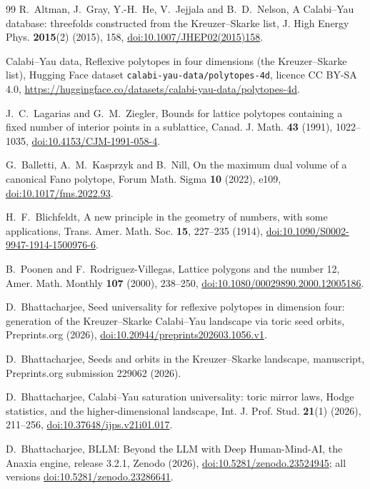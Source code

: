\documentclass[manuscript]{aomart}
\theoremstyle{definition}
\theoremstyle{remark}
\begin{document}
\begin{thebibliography}{99}
R.~Altman, J.~Gray, Y.-H.~He, V.~Jejjala and B.~D.~Nelson, A Calabi--Yau
database: threefolds constructed from the Kreuzer--Skarke list, J. High
Energy Phys. \textbf{2015}(2) (2015), 158,
\href{https://doi.org/10.1007/JHEP02(2015)158}{doi:10.1007/JHEP02(2015)158}.

Calabi--Yau data, Reflexive polytopes in four dimensions (the
Kreuzer--Skarke list), Hugging Face dataset
\texttt{calabi-yau-data/polytopes-4d}, licence CC BY-SA 4.0,
\url{https://huggingface.co/datasets/calabi-yau-data/polytopes-4d}.

J.~C.~Lagarias and G.~M.~Ziegler, Bounds for lattice polytopes containing
a fixed number of interior points in a sublattice, Canad. J. Math.
\textbf{43} (1991), 1022--1035,
\href{https://doi.org/10.4153/CJM-1991-058-4}{doi:10.4153/CJM-1991-058-4}.

G.~Balletti, A.~M.~Kasprzyk and B.~Nill, On the maximum dual volume of a
canonical Fano polytope, Forum Math. Sigma \textbf{10} (2022), e109,
\href{https://doi.org/10.1017/fms.2022.93}{doi:10.1017/fms.2022.93}.

H.~F.~Blichfeldt, A new principle in the geometry of numbers, with some
applications, Trans. Amer. Math. Soc. \textbf{15}, 227--235 (1914),
\href{https://doi.org/10.1090/S0002-9947-1914-1500976-6}{doi:10.1090/S0002-9947-1914-1500976-6}.

B.~Poonen and F.~Rodriguez-Villegas, Lattice polygons and the number 12,
Amer. Math. Monthly \textbf{107} (2000), 238--250,
\href{https://doi.org/10.1080/00029890.2000.12005186}{doi:10.1080/00029890.2000.12005186}.

D.~Bhattacharjee, Seed universality for reflexive polytopes in dimension
four: generation of the Kreuzer--Skarke Calabi--Yau landscape via toric
seed orbits, Preprints.org (2026),
\href{https://doi.org/10.20944/preprints202603.1056.v1}{doi:10.20944/preprints202603.1056.v1}.

D.~Bhattacharjee, Seeds and orbits in the Kreuzer--Skarke landscape,
manuscript, Preprints.org submission 229062 (2026).

D.~Bhattacharjee, Calabi--Yau saturation universality: toric mirror laws,
Hodge statistics, and the higher-dimensional landscape, Int. J. Prof.
Stud. \textbf{21}(1) (2026), 211--256,
\href{https://doi.org/10.37648/ijps.v21i01.017}{doi:10.37648/ijps.v21i01.017}.

D.~Bhattacharjee, BLLM: Beyond the LLM with Deep Human-Mind-AI, the Anaxia
engine, release 3.2.1, Zenodo (2026),
\href{https://doi.org/10.5281/zenodo.23524945}{doi:10.5281/zenodo.23524945};
all versions
\href{https://doi.org/10.5281/zenodo.23286641}{doi:10.5281/zenodo.23286641}.


\end{thebibliography}
\end{document}

